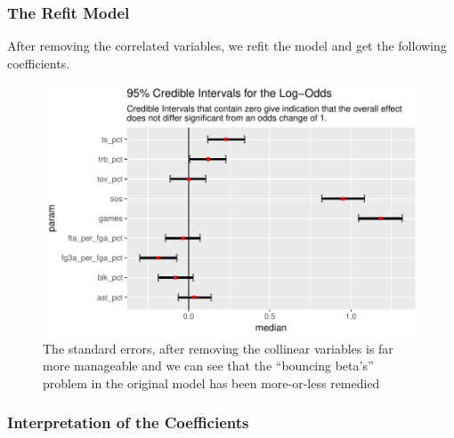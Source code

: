 \documentclass[10pt,a4paper, hidelinks]{article} %
\begin{document}
\subsubsection{The Refit Model}

After removing the correlated variables, we refit the model and get the following coefficients.

\begin{figure}[H]
	\centering
	
\end{figure}

\begin{figure}[H]
	\centering
	\includegraphics[width=1\linewidth]{../fig/polr_coef}
	\caption{The standard errors, after removing the collinear variables is far more manageable and we can see that the ``bouncing beta's'' problem in the original model has been more-or-less remedied}
	\label{fig:polr_coef}
\end{figure}


\subsubsection{Interpretation of the Coefficients}
\end{document}
